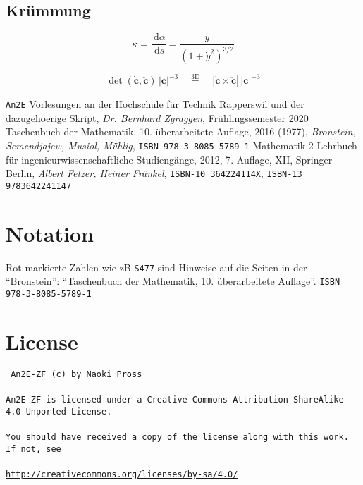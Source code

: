\documentclass[a4paper]{article}
\numberwithin{equation}{subsection}
\newcommand{\dd}[1]{\ensuremath{~\mathrm{d}#1}}
\newcommand{\deriv}[2]{\ensuremath{\frac{\dd{#1}}{\dd{#2}}}}
\renewcommand{\vec}[1]{\ensuremath{\bm{#1}}}
\newcommand{\brpage}[1]{\textcolor{red!70!black}{\small\texttt{S#1}}}
\begin{document}
\begin{multicols}{2}
\subsection{Kr\"ummung}
\[
	\kappa = \deriv{\alpha}{s} = \frac{\ddot{y}}{(1+\dot{y}^2)^{3/2}}
\]

\[
	\det(\vec{\dot{c}}, \vec{\ddot{c}})\,|\vec{c}|^{-3}
	\quad \stackrel{\text{3D}}{=} \quad
	|\vec{\dot{c}}\times\vec{\ddot{c}}|\,|\vec{c}|^{-3}
\]

\begin{thebibliography}{1}
    \texttt{An2E} Vorlesungen an der Hochschule f\"ur Technik Rapperswil und der dazugehoerige Skript,
    \textit{Dr. Bernhard Zgraggen}, Fr\"uhlingssemester 2020
    Taschenbuch der Mathematik,
    10. \"uberarbeitete Auflage, 2016 (1977),
    \textit{Bronstein, Semendjajew, Musiol, M\"uhlig}, 
    \texttt{ISBN 978-3-8085-5789-1}
    Mathematik 2 Lehrbuch für ingenieurwissenschaftliche Studieng\"ange,
    2012, 7. Auflage, XII, Springer Berlin,
    \textit{Albert Fetzer, Heiner Fränkel},
    \texttt{ISBN-10 364224114X},
    \texttt{ISBN-13 9783642241147}
    
\end{thebibliography}

\section*{Notation}
Rot markierte Zahlen wie zB \brpage{477} sind Hinweise auf die Seiten in der ``Bronstein'': ``Taschenbuch der Mathematik, 10. \"uberarbeitete Auflage''. \texttt{ISBN 978-3-8085-5789-1}

\section*{License}
{ \tt
An2E-ZF (c) by Naoki Pross
\\\\
An2E-ZF is licensed under a Creative Commons Attribution-ShareAlike 4.0 Unported License.
\\\\
You should have received a copy of the license along with this work. If not, see 
\\\\
\url{http://creativecommons.org/licenses/by-sa/4.0/}
}

\end{multicols}
\end{document}
